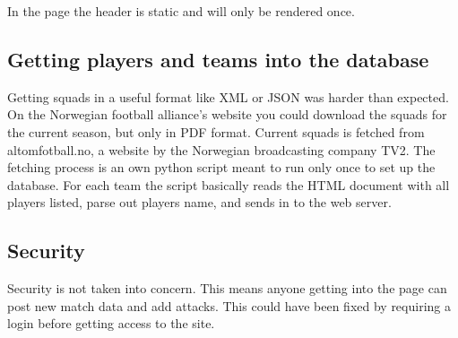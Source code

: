 In the page the header is static and will only be rendered once.

\subsection{Getting players and teams into the database}

Getting squads in a useful format like \ac{XML} or \ac{JSON} was harder than expected. On the Norwegian football alliance's website you could download the squads for the current season, but only in PDF format. Current squads is fetched from altomfotball.no, a website by the Norwegian broadcasting company TV2. The fetching process is an own python script meant to run only once to set up the database. For each team the script basically reads the HTML document with all players listed, parse out players name, and sends in to the web server.


\subsection{Security}
Security is not taken into concern. This means anyone getting into the page can post new match data and add attacks. This could have been fixed by requiring a login before getting access to the site. 







